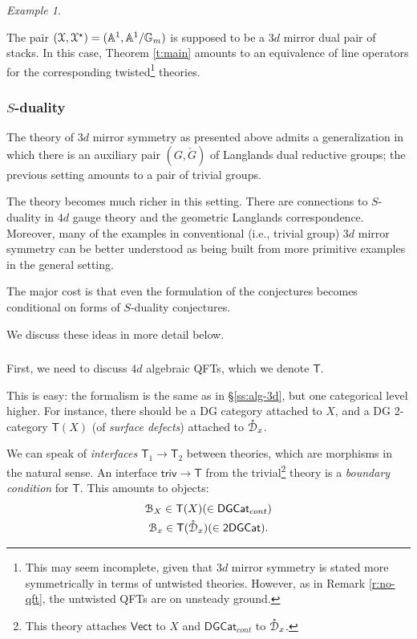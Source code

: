 \documentclass[reqno,11pt]{amsart}
\numberwithin{equation}{subsection}
\theoremstyle{remark}
\newtheorem{example}[thm]{Example}
\newcommand{\bA}{{\mathbb A}}
\newcommand{\bG}{{\mathbb G}}
\newcommand{\sB}{{\EuScript B}}
\newcommand{\sD}{{\EuScript D}}
\newcommand{\sX}{{\EuScript X}}
\newcommand{\Vect}{\mathsf{Vect}}
\newcommand{\DGCat}{\mathsf{DGCat}}
\renewcommand{\o}[1]{\mathring{#1}}
\begin{document}
\begin{example}\label{e:mirror-tate-ungauged}

The pair $(\sX,\sX^{\star}) = (\bA^1,\bA^1/\bG_m)$ is supposed to be a $3d$ mirror
dual pair of stacks. In this case, Theorem \ref{t:main} amounts to 
an equivalence of line operators for the corresponding twisted\footnote{This
may seem incomplete, given that $3d$ mirror symmetry is stated more symmetrically 
in terms of untwisted theories. However, as in Remark \ref{r:no-qft}, 
the untwisted QFTs are on unsteady ground.}  
theories.

\end{example}

\subsubsection{$S$-duality}\label{sss:s}

The theory of $3d$ mirror symmetry as presented above admits a generalization
in which there is an auxiliary pair $(G,\check{G})$ of Langlands dual
reductive groups; the previous setting amounts to a pair of trivial groups.

The theory becomes much richer in this setting. There are connections
to $S$-duality in $4d$ gauge theory and the geometric Langlands correspondence.
Moreover, many of the examples in conventional (i.e., trivial group) $3d$ mirror
symmetry can be better understood as being built from more primitive 
examples in the general setting. 

The major cost is that even the formulation of the conjectures 
becomes conditional on forms of $S$-duality conjectures.  

We discuss these ideas in more detail below. 

\subsubsection{}

First, we need to discuss $4d$ algebraic QFTs, which we denote $\mathsf{T}$.

This is easy: the formalism is the same as in \S \ref{ss:alg-3d},
but one categorical level higher. For instance, there should 
be a DG category attached to $X$, and a DG 2-category $\mathsf{T}(X)$
(of \emph{surface defects}) attached to
$\o{\sD}_x$.

We can speak of \emph{interfaces} $\mathsf{T}_1 \to \mathsf{T}_2$ between 
theories, which are morphisms in the natural sense. An interface 
$\mathsf{triv} \to \mathsf{T}$ from
the trivial\footnote{This theory attaches $\Vect$ to $X$ and 
$\DGCat_{cont}$ to $\o{\sD}_x$.}
theory is a \emph{boundary condition} for $\mathsf{T}$.
This amounts to objects:
%
\[
\begin{gathered}
\sB_X \in \mathsf{T}(X) (\in \DGCat_{cont})  \\
\sB_x \in \mathsf{T}(\o{\sD}_x) (\in \mathsf{2DGCat}).
\end{gathered}
\] 
\end{document}
